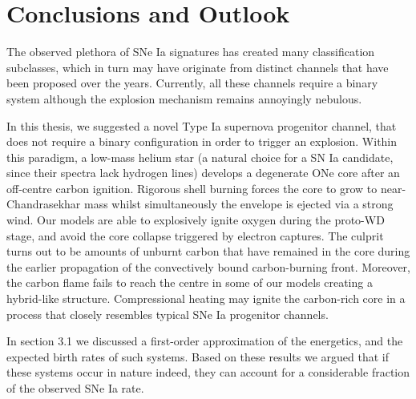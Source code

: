 \documentclass[../../main/thesis_msc.tex]{subfiles}
\begin{document}
	\chapter{Conclusions and Outlook}
	
		The observed plethora of SNe Ia signatures has created many classification subclasses, which in turn may have originate from distinct channels that have been proposed over the years. Currently, all these channels require a binary system although the explosion mechanism remains annoyingly nebulous. 


		In this thesis, we suggested a novel Type Ia supernova progenitor channel, that does not require a binary configuration in order to trigger an explosion. Within this paradigm, a low-mass helium star (a natural choice for a SN Ia candidate, since their spectra lack hydrogen lines) develops a degenerate ONe core after an off-centre carbon ignition. Rigorous shell burning forces the core to grow to near-Chandrasekhar mass whilst simultaneously the envelope is ejected via a strong wind. Our models are able to explosively ignite oxygen during the proto-WD stage, and avoid the core collapse triggered by electron captures. The culprit turns out to be amounts of unburnt carbon that have remained in the core during the earlier propagation of the convectively bound carbon-burning front.
		Moreover, the carbon flame fails to reach the centre in some of our models creating a hybrid-like structure. Compressional heating may ignite the carbon-rich core in a process that closely resembles typical SNe Ia progenitor channels.
		
		
		In section 3.1 we discussed a first-order approximation of the energetics, and the expected birth rates of such systems. Based on these results we argued that if these systems occur in nature indeed, they can account for a considerable fraction of the observed SNe Ia rate.
		
		
		 
	
		
\end{document}
